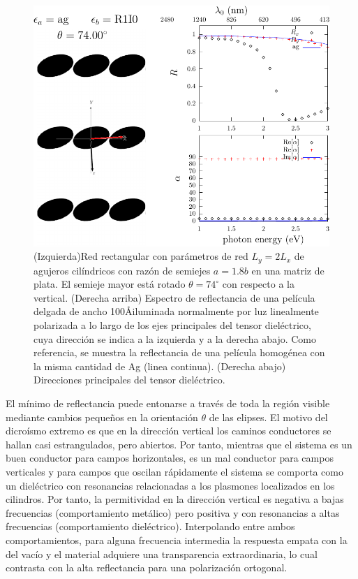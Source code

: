 \documentclass[12pt]{article}
\begin{document}
\begin{figure}
  \centering
  \includegraphics[width=.8\textwidth]{fig15}
  \caption{(Izquierda)Red rectangular con parámetros de red $L_y=2L_x$ de
    agujeros cilíndricos con razón de semiejes $a=1.8b$ en una matriz
    de plata. El semieje mayor está rotado $\theta=74^\circ$ con
    respecto a la vertical. (Derecha arriba) Espectro de reflectancia
    de una película delgada de ancho 100\AA iluminada normalmente por
    luz linealmente polarizada a lo largo de los ejes principales del
    tensor dieléctrico, cuya dirección se indica a la izquierda y a la
    derecha abajo. Como referencia, se muestra la reflectancia de una
    película homogénea con la misma cantidad de Ag (linea
    continua). (Derecha abajo) Direcciones principales del tensor
    dieléctrico.}
  \label{fig:elipses}
\end{figure}
El mínimo de reflectancia puede entonarse a través de toda la región
visible mediante cambios pequeños en la orientación $\theta$ de las
elipses. El motivo del dicroísmo extremo es que en la dirección
vertical los caminos conductores se hallan casi estrangulados, pero
abiertos. Por tanto, mientras que el sistema es un buen conductor para
campos horizontales, es un mal conductor para campos verticales y para
campos que oscilan rápidamente el sistema se comporta como un
dieléctrico con resonancias relacionadas a los plasmones localizados
en los cilindros. Por tanto, la permitividad en la dirección vertical
es negativa a bajas frecuencias (comportamiento metálico) pero
positiva y con resonancias a altas frecuencias (comportamiento
dieléctrico). Interpolando entre ambos comportamientos, para alguna
frecuencia intermedia la respuesta empata con la del vacío y el
material adquiere una transparencia extraordinaria, lo cual contrasta
con la alta reflectancia para una polarización ortogonal.
\end{document}

